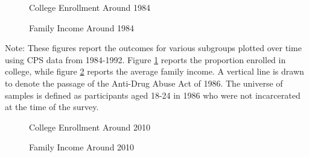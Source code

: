 

\begin{figure}[h]
    \centering
    \caption{College Enrollment Around 1984}%
    \qquad
    \label{fig:raw_college_1986}%
  \end{figure}
  
  \begin{figure}[h]
    \centering
    \caption{Family Income Around 1984}%
    \qquad
    \label{fig:raw_faminc_1986}%
  \end{figure}
  
  \begin{footnotesize}
    \noindent Note: These figures report the outcomes for various subgroups plotted over time using CPS data from 1984-1992. Figure \ref{fig:raw_college_1986} reports the proportion enrolled in college, while figure \ref{fig:raw_faminc_1986} reports the average family income. A vertical line is drawn to denote the passage of the Anti-Drug Abuse Act of 1986. The universe of samples is defined as participants aged 18-24 in 1986 who were not incarcerated at the time of the survey.
  \end{footnotesize}
  
  \clearpage
  
  
  \begin{figure}[h]
    \centering
    \caption{College Enrollment Around 2010}%
    \qquad
    \label{fig:raw_college_2010}%
  \end{figure}
  
  \begin{figure}[h]
    \centering
    \caption{Family Income Around 2010}%
    \qquad
    \label{fig:raw_faminc_2010}%
  \end{figure}
  
